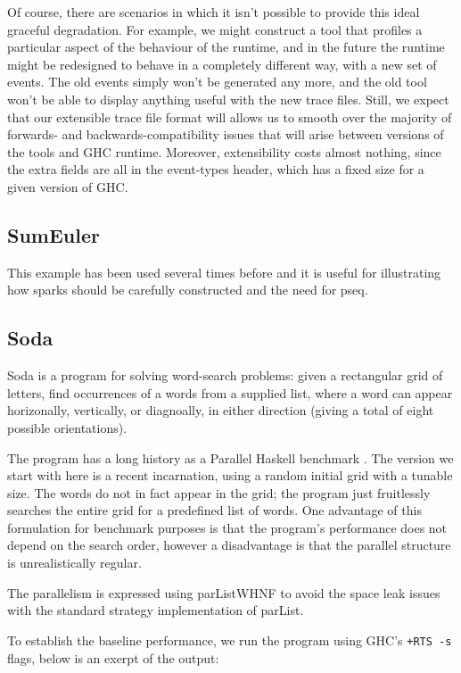\documentclass[twocolumn,9pt]{sigplanconf}
\newcommand{\codef}[1]{{\fontfamily{cmss}\small#1}}
\let\cite=\citep
\begin{document}
Of course, there are scenarios in which it isn't possible to provide
this ideal graceful degradation.  For example, we might construct a
tool that profiles a particular aspect of the behaviour of the
runtime, and in the future the runtime might be redesigned to behave
in a completely different way, with a new set of events.  The old
events simply won't be generated any more, and the old tool won't be
able to display anything useful with the new trace files.  Still, we
expect that our extensible trace file format will allows us to smooth
over the majority of forwards- and backwards-compatibility issues that
will arise between versions of the tools and GHC runtime.  Moreover,
extensibility costs almost nothing, since the extra fields are all in
the event-types header, which has a fixed size for a given version of
GHC.

\subsection{SumEuler}
This example has been used several times before and it is useful for illustrating how sparks should be carefully constructed and the need for pseq.

\subsection{Soda}

Soda is a program for solving word-search problems: given a
rectangular grid of letters, find occurrences of a words from a
supplied list, where a word can appear horizonally, vertically, or
diagnoally, in either direction (giving a total of eight possible
orientations).

The program has a long history as a Parallel Haskell benchmark
\cite{soda}.  The version we start with here is a recent incarnation,
using a random initial grid with a tunable size.  The words do not in
fact appear in the grid; the program just fruitlessly searches the
entire grid for a predefined list of words.  One advantage of this
formulation for benchmark purposes is that the program's performance
does not depend on the search order, however a disadvantage is that
the parallel structure is unrealistically regular.

The parallelism is expressed using \codef{parListWHNF} \cite{multicore-ghc}
to avoid the space leak issues with the standard strategy
implementation of \codef{parList}.

To establish the baseline performance, we run the program using GHC's
\texttt{+RTS -s} flags, below is an exerpt of the output:
\end{document}
